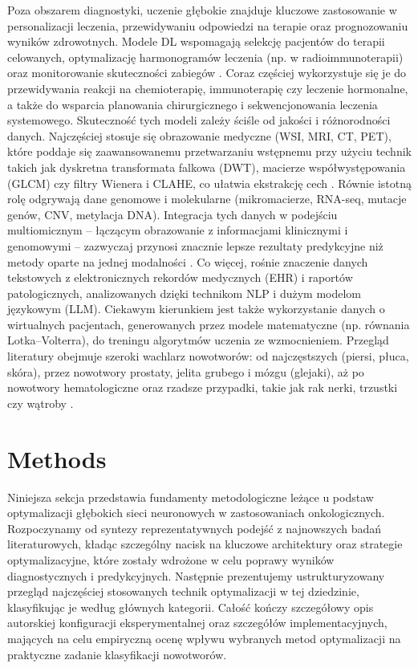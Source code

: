 Poza obszarem diagnostyki, uczenie głębokie znajduje kluczowe zastosowanie w personalizacji leczenia, przewidywaniu odpowiedzi na terapie oraz prognozowaniu wyników zdrowotnych. Modele DL wspomagają selekcję pacjentów do terapii celowanych, optymalizację harmonogramów leczenia (np. w radioimmunoterapii) oraz monitorowanie skuteczności zabiegów \cite{HH1, HH2, EE1}. Coraz częściej wykorzystuje się je do przewidywania reakcji na chemioterapię, immunoterapię czy leczenie hormonalne, a także do wsparcia planowania chirurgicznego i sekwencjonowania leczenia systemowego. Skuteczność tych modeli zależy ściśle od jakości i różnorodności danych. Najczęściej stosuje się obrazowanie medyczne (WSI, MRI, CT, PET), które poddaje się zaawansowanemu przetwarzaniu wstępnemu przy użyciu technik takich jak dyskretna transformata falkowa (DWT), macierze współwystępowania (GLCM) czy filtry Wienera i CLAHE, co ułatwia ekstrakcję cech \cite{EE1, GG1}.
Równie istotną rolę odgrywają dane genomowe i molekularne (mikromacierze, RNA-seq, mutacje genów, CNV, metylacja DNA). Integracja tych danych w podejściu multiomicznym – łączącym obrazowanie z informacjami klinicznymi i genomowymi – zazwyczaj przynosi znacznie lepsze rezultaty predykcyjne niż metody oparte na jednej modalności \cite{EE1, CC2}. Co więcej, rośnie znaczenie danych tekstowych z elektronicznych rekordów medycznych (EHR) i raportów patologicznych, analizowanych dzięki technikom NLP i dużym modelom językowym (LLM). Ciekawym kierunkiem jest także wykorzystanie danych o wirtualnych pacjentach, generowanych przez modele matematyczne (np. równania Lotka–Volterra), do treningu algorytmów uczenia ze wzmocnieniem. Przegląd literatury obejmuje szeroki wachlarz nowotworów: od najczęstszych (piersi, płuca, skóra), przez nowotwory prostaty, jelita grubego i mózgu (glejaki), aż po nowotwory hematologiczne oraz rzadsze przypadki, takie jak rak nerki, trzustki czy wątroby \cite{BB1, DD1, UU1}.

\section{Methods}
Niniejsza sekcja przedstawia fundamenty metodologiczne leżące u podstaw optymalizacji głębokich sieci neuronowych w zastosowaniach onkologicznych. Rozpoczynamy od syntezy reprezentatywnych podejść z najnowszych badań literaturowych, kładąc szczególny nacisk na kluczowe architektury oraz strategie optymalizacyjne, które zostały wdrożone w celu poprawy wyników diagnostycznych i predykcyjnych. Następnie prezentujemy ustrukturyzowany przegląd najczęściej stosowanych technik optymalizacji w tej dziedzinie, klasyfikując je według głównych kategorii. Całość kończy szczegółowy opis autorskiej konfiguracji eksperymentalnej oraz szczegółów implementacyjnych, mających na celu empiryczną ocenę wpływu wybranych metod optymalizacji na praktyczne zadanie klasyfikacji nowotworów.

